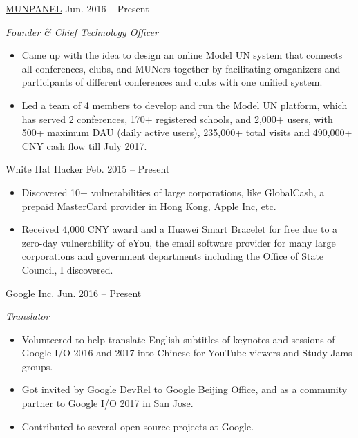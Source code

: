 \documentclass[hidelinks__VERSION__]{adamyi-cv} %
\begin{document}
\begin{entrylist}


\entry
{\href{https://www.munpanel.com}{MUNPANEL}}
{Jun. 2016 -- Present}
{\emph{Founder \& Chief Technology Officer}
\begin{itemize}
\item Came up with the idea to design an online Model UN system that connects all conferences, clubs, and MUNers together by facilitating oraganizers and participants of different conferences and clubs with one unified system.
\item Led a team of 4 members to develop and run the Model UN platform, which has served 2 conferences, 170+ registered schools, and 2,000+ users, with 500+ maximum DAU (daily active users), 235,000+ total visits and 490,000+ CNY cash flow till July 2017.
\end{itemize}}


\entry
{White Hat Hacker}
{Feb. 2015 -- Present}
{\begin{itemize}
\item Discovered 10+ vulnerabilities of large corporations, like GlobalCash, a prepaid MasterCard provider in Hong Kong, Apple Inc, etc.
\item Received 4,000 CNY award and a Huawei Smart Bracelet for free due to a zero-day vulnerability of eYou, the email software provider for many large corporations and government departments including the Office of State Council, I discovered.
\end{itemize}}


\entry
{Google Inc.}
{Jun. 2016 -- Present}
{\emph{Translator}
\begin{itemize}
\item Volunteered to help translate English subtitles of keynotes and sessions of Google I/O 2016 and 2017 into Chinese for YouTube viewers and Study Jams groups.
\item Got invited by Google DevRel to Google Beijing Office, and as a community partner to Google I/O 2017 in San Jose.
\item Contributed to several open-source projects at Google.
\end{itemize}}



\end{entrylist}
\end{document}
